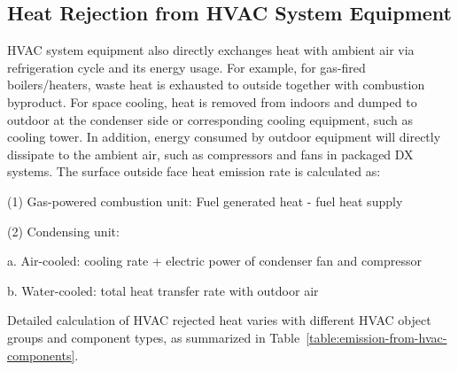 \subsection{Heat Rejection from HVAC System Equipment}\label{emission-from-HVAC-reject}

HVAC system equipment also directly exchanges heat with ambient air via refrigeration cycle and its energy usage. For example, for gas-fired boilers/heaters, waste heat is exhausted to outside together with combustion byproduct. For space cooling, heat is removed from indoors and dumped to outdoor at the condenser side or corresponding cooling equipment, such as cooling tower. In addition, energy consumed by outdoor equipment will directly dissipate to the ambient air, such as compressors and fans in packaged DX systems. The surface outside face heat emission rate is calculated as:

(1)	Gas-powered combustion unit: Fuel generated heat - fuel heat supply

(2)	Condensing unit:

a.	Air-cooled: cooling rate + electric power of condenser fan and compressor

b.	Water-cooled: total heat transfer rate with outdoor air

Detailed calculation of HVAC rejected heat varies with different HVAC object groups and component types, as summarized in Table~\ref{table:emission-from-hvac-components}.

